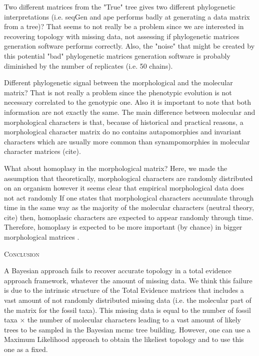 \documentclass[12pt,letterpaper]{article}
\renewcommand{\section}[1]{%
\bigskip
\begin{center}
\begin{Large}
\normalfont\scshape #1
\medskip
\end{Large}
\end{center}}
\begin{document}
Two different matrices from the "True" tree gives two different phylogenetic interpretations (i.e. seqGen and ape performs badly at generating a data matrix from a tree)?
That seems to not really be a problem since we are interested in recovering topology with missing data, not assessing if phylogenetic matrices generation software performs correctly.
Also, the "noise" that might be created by this potential "bad" phylogenetic matrices generation software is probably diminished by the number of replicates (i.e. 50 chains).

Different phylogenetic signal between the morphological and the molecular matrix?
That is not really a problem since the phenotypic evolution is not necessary correlated to the genotypic one.
Also it is important to note that both information are not exactly the same.
The main difference between molecular and morphological characters is that, because of historical and practical reasons, a morphological character matrix do no contains autapomorphies and invariant characters which are usually more common than synampomorphies in molecular character matrices (cite).

What about homoplasy in the morphological matrix?
Here, we made the assumption that theoretically, morphological characters are randomly distributed on an organism however it seems clear that empirical morphological data does not act randomly
If one states that morphological characters accumulate through time in the same way as the majority of the molecular characters (neutral theory, cite) then, homoplasic characters are expected to appear randomly through time.
Therefore, homoplasy is expected to be more important (by chance) in bigger morphological matrices \citep{davalosintegrating2014}.

\section{Conclusion}
A Bayesian approach fails to recover accurate topology in a total evidence approach framework, whatever the amount of missing data.
We think this failure is due to the intrinsic structure of the Total Evidence matrices that includes a vast amount of not randomly distributed missing data (i.e. the molecular part of the matrix for the fossil taxa).
This missing data is equal to the number of fossil taxa $\times$ the number of molecular characters leading to a vast amount of likely trees to be sampled in the Bayesian mcmc tree building.
However, one can use a Maximum Likelihood approach to obtain the likeliest topology and to use this one as a fixed.
\end{document}
